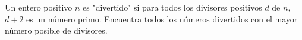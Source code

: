 Un entero positivo $n$ es "divertido" si para todos los divisores positivos $d$ de $n$, $d+2$ es un número primo. Encuentra todos los números divertidos con el mayor número posible de divisores.
